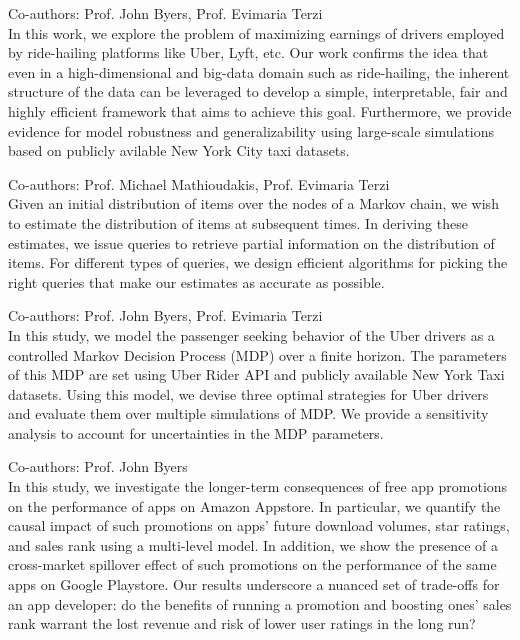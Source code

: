 \documentclass[10pt]{moderncv}
\begin{document}
{
    Co-authors: Prof. John Byers, Prof. Evimaria Terzi\\
    In this work, we explore the problem of maximizing earnings of drivers employed by ride-hailing platforms like 
        Uber, Lyft, etc. Our work confirms the idea that even in a high-dimensional and big-data domain such as 
        ride-hailing, the inherent structure of the data can be leveraged to develop a simple, interpretable, fair and 
        highly efficient framework that aims to achieve this goal. 
    Furthermore, we provide evidence for model robustness and generalizability using large-scale simulations based on 
        publicly avilable New York City taxi datasets.
}

{
    Co-authors: Prof. Michael Mathioudakis, Prof. Evimaria Terzi\\
    Given an initial distribution of items over the nodes of a Markov chain, we wish to estimate the distribution of 
        items at subsequent times. In deriving these estimates, we issue queries to retrieve partial information on the 
        distribution of items. 
    For different types of queries, we design efficient algorithms for picking the right queries that make our 
        estimates as accurate as possible.
}

{
    Co-authors: Prof. John Byers, Prof. Evimaria Terzi\\
    In this study, we model the passenger seeking behavior of the Uber drivers as a controlled Markov Decision Process 
        (MDP) over a finite horizon. 
    The parameters of this MDP are set using Uber Rider API and publicly available New York Taxi datasets.
    Using this model, we devise three optimal strategies for Uber drivers and evaluate them over multiple simulations 
        of MDP. 
    We provide a sensitivity analysis to account for uncertainties in the MDP parameters.
}

{
    Co-authors: Prof. John Byers\\
    In this study, we investigate the longer-term consequences of free app promotions on the performance of apps on 
        Amazon Appstore. 
    In particular, we quantify the causal impact of such promotions on apps’ future download volumes, star ratings, and 
        sales rank using a multi-level model. 
    In addition, we show the presence of a cross-market spillover effect of such promotions on the performance of the 
        same apps on Google Playstore. 
    Our results underscore a nuanced set of trade-offs for an app developer: do the benefits of running a promotion and 
        boosting ones’ sales rank warrant the lost revenue and risk of lower user ratings in the long run?
}
\end{document}
